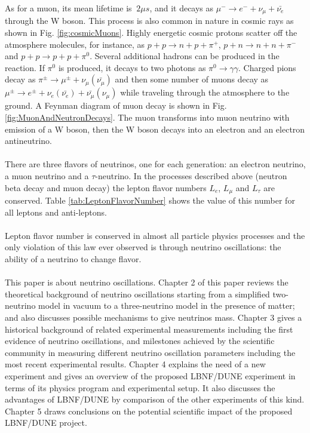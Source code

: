 As for a muon, its mean lifetime is $~2 {\mu}s$, and it decays as ${\mu}^- \rightarrow e^- + {\nu}_{\mu} + \bar{{\nu}_e}$ through the W boson. This process is also common in nature in cosmic rays as shown in Fig. \ref{fig:cosmicMuons}. Highly energetic cosmic protons scatter off the atmosphere molecules, for instance, as $p+p \rightarrow n+p+\pi^+$, $p+n \rightarrow n+n+\pi^-$ and $p+p \rightarrow p+p+\pi^0$. Several additional hadrons can be produced in the reaction. If $\pi^0$ is produced, it decays to two photons as $\pi^0 \rightarrow \gamma\gamma$. Charged pions decay as $\pi^{\pm} \rightarrow \mu^{\pm} + \nu_\mu(\bar{\nu_\mu})$ and then some number of muons decay as $\mu^{\pm} \rightarrow e^{\pm} + \nu_e(\bar{\nu_e}) + \bar{\nu_\mu}(\nu_\mu)$ while traveling through the atmosphere to the ground. A Feynman diagram of muon decay is shown in Fig. \ref{fig:MuonAndNeutronDecays}. The muon transforms into muon neutrino with emission of a W boson, then the W boson decays into an electron and an electron antineutrino.\\ \\
There are three flavors of neutrinos, one for each generation: an electron neutrino, a muon neutrino and a $\tau$-neutrino. In the processes described above (neutron beta decay and muon decay) the lepton flavor numbers $L_e$, $L_{\mu}$ and $L_{\tau}$ are conserved. Table \ref{tab:LeptonFlavorNumber} shows the value of this number for all leptons and anti-leptons. \\ \\
Lepton flavor number is conserved in almost all particle physics processes and the only violation of this law ever observed is through neutrino oscillations: the ability of a neutrino to change flavor.\\ \\
This paper is about neutrino oscillations. Chapter 2 of this paper reviews the theoretical background of neutrino oscillations starting from a simplified two-neutrino model in vacuum to a three-neutrino model in the presence of matter; and also discusses possible mechanisms to give neutrinos mass. Chapter 3 gives a historical background of related experimental measurements including the first evidence of neutrino oscillations, and milestones achieved by the scientific community in measuring different neutrino oscillation parameters including the most recent experimental results. Chapter 4 explains the need of a new experiment and gives an overview of the proposed LBNF/DUNE experiment in terms of its physics program and experimental setup. It also discusses the advantages of LBNF/DUNE by comparison of the other experiments of this kind. Chapter 5 draws conclusions on the potential scientific impact of the proposed LBNF/DUNE project.  \\ \\
